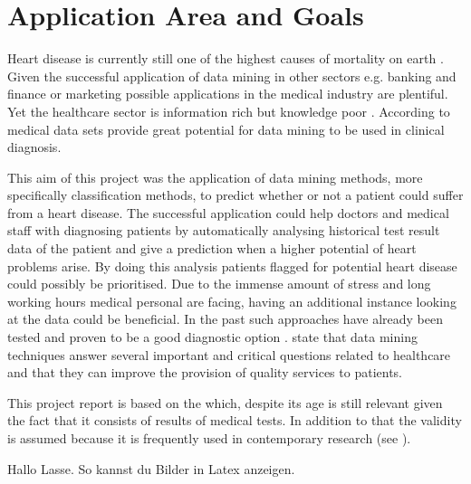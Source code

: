 \section{Application Area and Goals}

Heart disease is currently still one of the highest causes of mortality on earth \citep{nahar2013, kavitha2016, statistischesbundesamt2020}.
Given the successful application of data mining in other sectors e.g. banking and finance or marketing \citep{keles2017} possible applications in the medical industry are plentiful. Yet the healthcare sector is information rich but knowledge poor \citep{soni2011}. According to \citet{soni2011} medical data sets provide great potential for data mining to be used in clinical diagnosis.


This aim of this project was the application of data mining methods, more specifically classification methods, to predict whether or not a patient could suffer from a heart disease. The successful application could help doctors and medical staff with diagnosing patients by automatically analysing historical test result data of the patient and give a prediction when a higher potential of heart problems arise. By doing this analysis patients flagged for potential heart disease could possibly be prioritised. Due to the immense amount of stress and long working hours medical personal are facing, having  an additional instance looking at the data could be beneficial. 
In the past such approaches have already been tested and proven to be a good diagnostic option \citep{usharani2011}. \citet{jabbar2013} state that data mining techniques answer several important and critical questions related to healthcare and that they can improve the provision of quality services to patients.

This project report is based on the  \citep{janosi1988} which, despite its age is still relevant given the fact that it consists of results of medical tests. In addition to that the validity is assumed because it is frequently used in contemporary research (see \cite{usharani2011, aha1988, nahar2013}).


\newpage

Hallo Lasse. So kannst du Bilder in Latex anzeigen.

